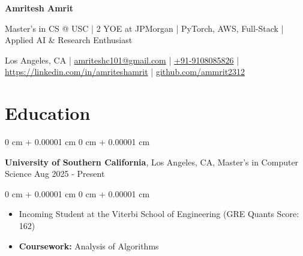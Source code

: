\documentclass[10pt, a4paper]{article}
\newenvironment{highlights}{
    \begin{itemize}[
        topsep=0.10 cm,
        parsep=0.10 cm,
        partopsep=0pt,
        itemsep=0pt,
        leftmargin=0 cm + 10pt
    ]
}{
    \end{itemize}
} %
\newenvironment{onecolentry}{
    \begin{adjustwidth}{
        0 cm + 0.00001 cm
    }{
        0 cm + 0.00001 cm
    }
}{
    \end{adjustwidth}
} %
\newenvironment{twocolentry}[2][]{
    \onecolentry
    \def\secondColumn{#2}
    \setcolumnwidth{\fill, 6.0 cm}
    \begin{paracol}{2}
}{
    \switchcolumn \raggedleft \secondColumn
    \end{paracol}
    \endonecolentry
} %
\newenvironment{header}{
    \setlength{\topsep}{0pt}\par\kern\topsep\centering\linespread{1.0}
}{
    \par\kern\topsep
} %
\begin{document}
    \newcommand{\AND}{\unskip
        \cleaders\copy\ANDbox\hskip\wd\ANDbox
        \ignorespaces
    }
    \newsavebox\ANDbox
    \sbox\ANDbox{$|$}

    \begin{header}
    \fontsize{20 pt}{20 pt}\selectfont \textbf{Amritesh Amrit}

    \vspace{1pt} %

    \normalsize
    Master’s in CS @ USC | 2 YOE at JPMorgan | PyTorch, AWS, Full-Stack | Applied AI \& Research Enthusiast

    \vspace{2pt} %

    \normalsize
    Los Angeles, CA | \href{mailto:amriteshc101@gmail.com}{amriteshc101@gmail.com} | \href{tel:+91-9108085826}{+91-9108085826} | \href{https://linkedin.com/in/amriteshamrit}{https://linkedin.com/in/amriteshamrit} | \href{https://github.com/ammrit2312}{github.com/ammrit2312}


\end{header}

    \vspace{5 pt - 0.3 cm}

    \section{Education}
        \begin{twocolentry}{
            Aug 2025 - Present
        }
            \textbf{University of Southern California}, Los Angeles, CA, Master's in Computer Science\end{twocolentry}

        \vspace{0.10 cm}
        \begin{onecolentry}
            \begin{highlights}
                \item Incoming Student at the Viterbi School of Engineering (GRE Quants Score: 162)
                \item \textbf{Coursework:} Analysis of Algorithms
            \end{highlights}
        \end{onecolentry}
\end{document}
